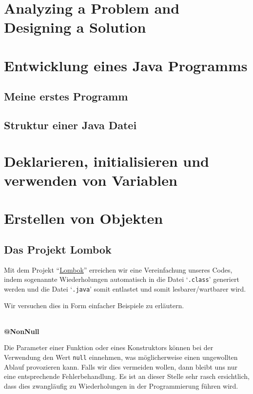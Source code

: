 \section{Analyzing a Problem and Designing a Solution}


\section{Entwicklung eines Java Programms}

\subsection{Meine erstes Programm}

\subsection{Struktur einer Java Datei}


\section{Deklarieren, initialisieren und verwenden von Variablen}

\section{Erstellen von Objekten}


\subsection{Das Projekt Lombok}

Mit dem Projekt ``\href{https://projectlombok.org/}{Lombok}'' erreichen wir 
eine Vereinfachung unseres Codes, indem sogenannte Wiederholungen automatisch 
in die Datei `{\tt .class}' generiert werden und die Datei `{\tt .java}' somit 
entlastet und somit lesbarer/wartbarer wird.

Wir versuchen dies in Form einfacher Beispiele zu erläutern.

\textbf{\\@NonNull}

Die Parameter einer Funktion oder eines Konstruktors können bei der Verwendung 
den Wert {\tt null} einnehmen, was möglicherweise einen ungewollten Ablauf 
provozieren kann. Falls wir dies vermeiden wollen, dann bleibt uns nur eine 
entsprechende Fehlerbehandlung. Es ist an dieser Stelle sehr rasch ersichtlich, 
dass dies zwangläufig zu Wiederholungen in der Programmierung führen wird.


